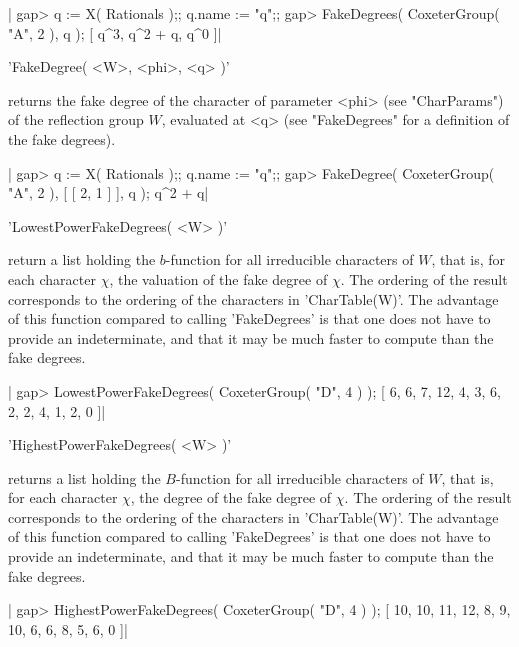 |    gap> q := X( Rationals );; q.name := "q";;
    gap> FakeDegrees( CoxeterGroup( "A", 2 ), q );
    [ q^3, q^2 + q, q^0 ]|


'FakeDegree( <W>, <phi>, <q> )'

returns  the  fake degree  of  the  character  of parameter  <phi>  (see
"CharParams")  of  the  reflection  group $W$,  evaluated  at  <q>  (see
"FakeDegrees" for a definition of the fake degrees).

|    gap> q := X( Rationals );; q.name := "q";;
    gap> FakeDegree( CoxeterGroup( "A", 2 ), [ [ 2, 1 ] ], q );
    q^2 + q|


'LowestPowerFakeDegrees( <W> )'

return a list holding the $b$-function for all irreducible characters of
$W$,  that is,  for each  character $\chi$,  the valuation  of the  fake
degree of $\chi$. The ordering of the result corresponds to the ordering
of  the characters  in 'CharTable(W)'.  The advantage  of this  function
compared to calling  'FakeDegrees' is that one does not  have to provide
an indeterminate,  and that it  may be much  faster to compute  than the
fake degrees.

|    gap> LowestPowerFakeDegrees( CoxeterGroup( "D", 4 ) );
    [ 6, 6, 7, 12, 4, 3, 6, 2, 2, 4, 1, 2, 0 ]|


'HighestPowerFakeDegrees( <W> )'

returns a list  holding the $B$-function for  all irreducible characters
of  $W$, that  is, for  each character  $\chi$, the  degree of  the fake
degree of $\chi$. The ordering of the result corresponds to the ordering
of  the characters  in 'CharTable(W)'.  The advantage  of this  function
compared to calling  'FakeDegrees' is that one does not  have to provide
an indeterminate,  and that it  may be much  faster to compute  than the
fake degrees.

|    gap> HighestPowerFakeDegrees( CoxeterGroup( "D", 4 ) );
    [ 10, 10, 11, 12, 8, 9, 10, 6, 6, 8, 5, 6, 0 ]|


